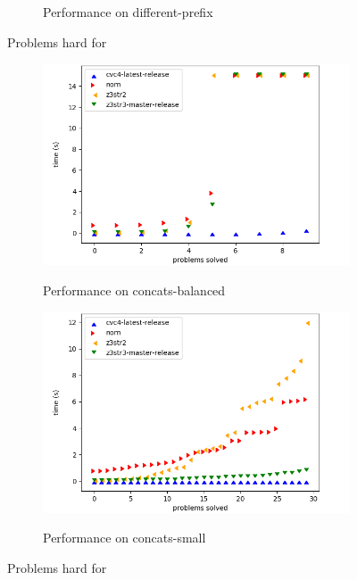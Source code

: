 \begin{figure}[h]
\begin{subfigure}{.5\textwidth}
        \vspace{-0.25in}
        \caption{Performance on different-prefix}
        \label{fig:different-prefix}
    \end{subfigure}
    \vspace{-0.1in}
    \caption{Problems hard for \cvc{}}
    \label{fig:cvc-hard}
    \vspace{-0.3in}
\end{figure}

\begin{figure}[h]
\vspace{-0.25in}
    \begin{subfigure}{.5\textwidth}
        \includegraphics[width=\textwidth]{data/graphs/concats-balanced.png}
        \label{fig:concats-balanced}
        \vspace{-0.25in}
        \caption{Performance on concats-balanced}
    \end{subfigure}
    \begin{subfigure}{.5\textwidth}
        \includegraphics[width=\textwidth]{data/graphs/concats-small.png}
        \label{fig:concats-small}
        \vspace{-0.25in}
        \caption{Performance on concats-small}
    \end{subfigure}
    \vspace{-0.1in}
    \caption{Problems hard for \us{}}
    \label{fig:z3str3-hard}
    \vspace{-0.3in}
\end{figure}

